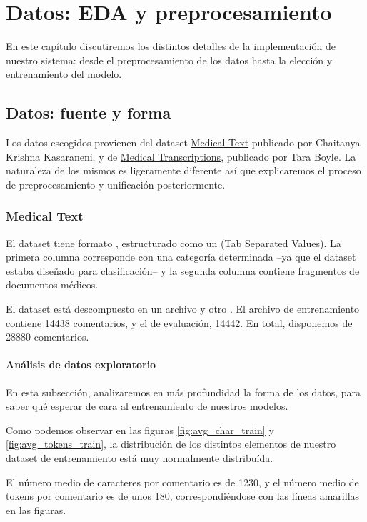 \chapter{Datos: EDA y preprocesamiento}

En este capítulo discutiremos los distintos detalles de la implementación de nuestro sistema: desde el preprocesamiento de los datos hasta la elección y entrenamiento del modelo.


\section{Datos: fuente y forma}
Los datos escogidos provienen del dataset \href{https://www.kaggle.com/chaitanyakck/medical-text}{Medical Text} publicado por Chaitanya Krishna Kasaraneni, y de \href{https://www.kaggle.com/tboyle10/medicaltranscriptions}{Medical Transcriptions}, publicado por Tara Boyle. La naturaleza de los mismos es ligeramente diferente así que explicaremos el proceso de preprocesamiento y unificación posteriormente.

\subsection{Medical Text}
El dataset tiene formato , estructurado como un  (Tab Separated Values). La primera columna corresponde con una categoría determinada --ya que el dataset estaba diseñado para clasificación-- y la segunda columna contiene fragmentos de documentos médicos.

El dataset está descompuesto en un archivo  y otro . El archivo de entrenamiento contiene 14438 comentarios, y el de evaluación, 14442. En total, disponemos de 28880 comentarios.

\subsubsection{Análisis de datos exploratorio}
En esta subsección, analizaremos en más profundidad la forma de los datos, para saber qué esperar de cara al entrenamiento de nuestros modelos.

Como podemos observar en las figuras \ref{fig:avg_char_train} y \ref{fig:avg_tokens_train}, la distribución de los distintos elementos de nuestro dataset de entrenamiento está muy normalmente distribuída.

El número medio de caracteres por comentario es de 1230, y el número medio de tokens por comentario es de unos 180, correspondiéndose con las líneas amarillas en las figuras.

